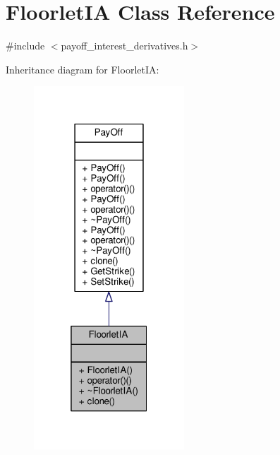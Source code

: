 \hypertarget{classFloorletIA}{}\section{Floorlet\+IA Class Reference}
\label{classFloorletIA}


{\ttfamily \#include $<$payoff\+\_\+interest\+\_\+derivatives.\+h$>$}



Inheritance diagram for Floorlet\+IA\+:
\nopagebreak
\begin{figure}[H]
\begin{center}
\leavevmode
\includegraphics[width=160pt]{classFloorletIA__inherit__graph}
\end{center}
\end{figure}


